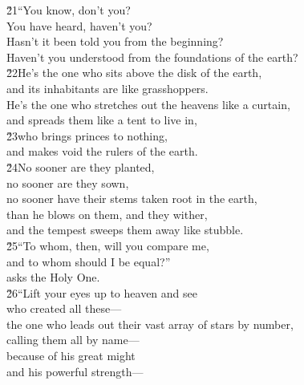 \begin{poetry}
\poeml \v{21}``You know, don't you? \\
\poemll    You have heard, haven't you? \\
\poeml Hasn't it been told you from the beginning? \\
\poemll    Haven't you understood from the foundations of the earth? \\
\poeml \v{22}He's the one who sits above the disk of the earth, \\
\poemll    and its inhabitants are like grasshoppers. \\
\poeml He's the one who stretches out the heavens like a curtain, \\
\poemll    and spreads them like a tent to live in, \\
\poeml \v{23}who brings princes to nothing, \\
\poemll    and makes void the rulers of the earth. \\
\poeml \v{24}No sooner are they planted, \\
\poemll    no sooner are they sown, \\
\poemlll       no sooner have their stems taken root in the earth, \\
\poeml than he blows on them, and they wither, \\
\poemll    and the tempest sweeps them away like stubble. \\
\poeml \v{25}``To whom, then, will you compare me, \\
\poemll    and to whom should I be equal?'' \\
\poemlll       asks the Holy One. \\
\poeml \v{26}``Lift your eyes up to heaven and see \\
\poemll    who created all these--- \\
\poeml the one who leads out their vast array of stars by number, \\
\poemll    calling them all by name--- \\
\poeml because of his great might \\
\poemll    and his powerful strength--- \\

\end{poetry}
